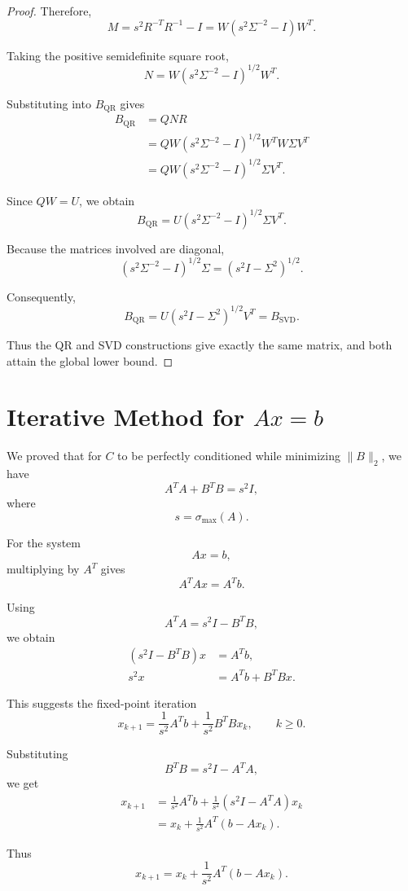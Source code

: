 \documentclass[11pt, reqno, a4paper]{amsart}
\theoremstyle{plain}
\theoremstyle{definition}
\theoremstyle{remark}
\numberwithin{equation}{section}
\begin{document}
\begin{proof}
Therefore,
\[
M=s^2R^{-T}R^{-1}-I
=
W(s^2\Sigma^{-2}-I)W^T.
\]

Taking the positive semidefinite square root,
\[
N
=
W(s^2\Sigma^{-2}-I)^{1/2}W^T.
\]

Substituting into $B_{\mathrm{QR}}$ gives
\begin{align*}
B_{\mathrm{QR}}
&=QNR\\
&=QW(s^2\Sigma^{-2}-I)^{1/2}
W^TW\Sigma V^T\\
&=QW(s^2\Sigma^{-2}-I)^{1/2}
\Sigma V^T.
\end{align*}

Since $QW=U$, we obtain
\[
B_{\mathrm{QR}}
=
U(s^2\Sigma^{-2}-I)^{1/2}
\Sigma V^T.
\]

Because the matrices involved are diagonal,
\[
(s^2\Sigma^{-2}-I)^{1/2}\Sigma
=
(s^2I-\Sigma^2)^{1/2}.
\]

Consequently,
\[
B_{\mathrm{QR}}
=
U(s^2I-\Sigma^2)^{1/2}V^T
=
B_{\mathrm{SVD}}.
\]

Thus the QR and SVD constructions give exactly the same matrix, and both attain the global lower bound.
\end{proof}


\section{Iterative Method for $Ax=b$}

We proved that for $C$ to be perfectly conditioned while minimizing $\|B\|_2$, we have
\[
A^TA+B^TB=s^2I,
\]
where
\[
s=\sigma_{\max}(A).
\]

For the system
\[
Ax=b,
\]
multiplying by $A^T$ gives
\[
A^TAx=A^Tb.
\]

Using
\[
A^TA=s^2I-B^TB,
\]
we obtain
\begin{align*}
(s^2I-B^TB)x&=A^Tb,\\
s^2x&=A^Tb+B^TBx.
\end{align*}

This suggests the fixed-point iteration
\[
\boxed{
x_{k+1}
=
\frac{1}{s^2}A^Tb
+
\frac{1}{s^2}B^TBx_k,
\qquad k\geq0.
}
\]

Substituting
\[
B^TB=s^2I-A^TA,
\]
we get
\begin{align*}
x_{k+1}
&=
\frac{1}{s^2}A^Tb
+
\frac{1}{s^2}(s^2I-A^TA)x_k\\
&=
x_k+\frac{1}{s^2}A^T(b-Ax_k).
\end{align*}

Thus
\[
\boxed{
x_{k+1}
=
x_k+\frac{1}{s^2}A^T(b-Ax_k).
}
\]
\end{document}

